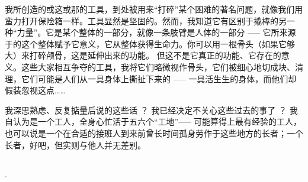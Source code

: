 \documentclass[oneside,12pt]{book}
\begin{document}
我所创造的或这或那的工具，到处被用来“打碎”某个困难的著名问题，就像我们用蛮力打开保险箱一样。工具显然是坚固的。然而，我知道它有区别于撬棒的另一种“力量”。它是某个整体的一部分，就像一条肢臂是人体的一部分 ----- 它所来源于的这个整体赋予它意义，它从整体获得生命力。你可以用一根骨头（如果它够大）来打碎颅骨，这是延伸出来的功能。
但这不是它真正的功能、它存在的意义。这些大家相互争夺的工具，我将它们略微视作骨头，它们被细心地切成块、清理，它们可能是人们从一具身体上撕扯下来的 ----- 一具活生生的身体，而他们却假装忽视这点……

我深思熟虑、反复掂量后说的这些话
？
我已经决定不关心这些过去的事了
？
我自认为是一个工人，全身心忙活于五六个“工地”\footnotemark ----- 可能算得上最有经验的工人，也可以说是一个在合适的接班人到来前曾长时间孤身劳作于这些地方的长者；一个长者，好吧，但实则与他人并无差别。
\footnotetext{}



\subsection{}

.
\end{document}
